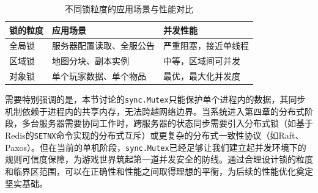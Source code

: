 \begin{table}[h]
\centering
\caption{不同锁粒度的应用场景与性能对比}
\label{tab:lock-granularity}
\begin{tabular}{p{3cm}p{5cm}p{4cm}}
\hline
\textbf{锁的粒度} & \textbf{应用场景} & \textbf{并发性能} \\
\hline
全局锁 & 服务器配置读取、全服公告 & 严重阻塞，接近单线程 \\
区域锁 & 地图分块、副本实例 & 中等，区域间可并发 \\
对象锁 & 单个玩家数据、单个物品 & 最优，最大化并发度 \\
\hline
\end{tabular}
\end{table}

需要特别强调的是，本节讨论的\texttt{sync.Mutex}只能保护单个进程内的数据，其同步机制依赖于进程内的共享内存，无法跨越网络边界。当系统进入第四章的分布式阶段，多台服务器需要协同工作时，跨服务器的状态同步需要引入分布式锁（如基于Redis的\texttt{SETNX}命令实现的分布式互斥）或更复杂的分布式一致性协议（如Raft、Paxos）。但在当前的单机阶段，\texttt{sync.Mutex}已经足够让我们建立起并发环境下的规则可信度保障，为游戏世界筑起第一道并发安全的防线。通过合理设计锁的粒度和临界区范围，可以在正确性和性能之间取得理想的平衡，为后续的性能优化奠定坚实基础。





